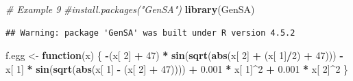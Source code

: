 \documentclass[
]{article}
\newenvironment{Shaded}{\begin{snugshade}}{\end{snugshade}}
\newcommand{\CommentTok}[1]{\textcolor[rgb]{0.56,0.35,0.01}{\textit{#1}}}
\newcommand{\ControlFlowTok}[1]{\textcolor[rgb]{0.13,0.29,0.53}{\textbf{#1}}}
\newcommand{\DecValTok}[1]{\textcolor[rgb]{0.00,0.00,0.81}{#1}}
\newcommand{\FloatTok}[1]{\textcolor[rgb]{0.00,0.00,0.81}{#1}}
\newcommand{\FunctionTok}[1]{\textcolor[rgb]{0.13,0.29,0.53}{\textbf{#1}}}
\newcommand{\NormalTok}[1]{#1}
\newcommand{\OtherTok}[1]{\textcolor[rgb]{0.56,0.35,0.01}{#1}}
\newcommand{\SpecialCharTok}[1]{\textcolor[rgb]{0.81,0.36,0.00}{\textbf{#1}}}
\begin{document}
\begin{Shaded}
\begin{Highlighting}[]
\CommentTok{\# Example 9}
\CommentTok{\#install.packages("GenSA")}
\FunctionTok{library}\NormalTok{(GenSA)}
\end{Highlighting}
\end{Shaded}

\begin{verbatim}
## Warning: package 'GenSA' was built under R version 4.5.2
\end{verbatim}

\begin{Shaded}
\begin{Highlighting}[]
\NormalTok{f.egg }\OtherTok{\textless{}{-}} \ControlFlowTok{function}\NormalTok{(x) \{}
    \SpecialCharTok{{-}}\NormalTok{(x[ }\DecValTok{2}\NormalTok{] }\SpecialCharTok{+} \DecValTok{47}\NormalTok{) }\SpecialCharTok{*} \FunctionTok{sin}\NormalTok{(}\FunctionTok{sqrt}\NormalTok{(}\FunctionTok{abs}\NormalTok{(x[ }\DecValTok{2}\NormalTok{] }\SpecialCharTok{+}\NormalTok{ (x[ }\DecValTok{1}\NormalTok{]}\SpecialCharTok{/}\DecValTok{2}\NormalTok{) }\SpecialCharTok{+} \DecValTok{47}\NormalTok{))) }\SpecialCharTok{{-}}
\NormalTok{        x[ }\DecValTok{1}\NormalTok{] }\SpecialCharTok{*} \FunctionTok{sin}\NormalTok{(}\FunctionTok{sqrt}\NormalTok{(}\FunctionTok{abs}\NormalTok{(x[ }\DecValTok{1}\NormalTok{] }\SpecialCharTok{{-}}\NormalTok{ (x[ }\DecValTok{2}\NormalTok{] }\SpecialCharTok{+} \DecValTok{47}\NormalTok{)))) }\SpecialCharTok{+} \FloatTok{0.001} \SpecialCharTok{*}
\NormalTok{        x[ }\DecValTok{1}\NormalTok{]}\SpecialCharTok{\^{}}\DecValTok{2} \SpecialCharTok{+} \FloatTok{0.001} \SpecialCharTok{*}\NormalTok{ x[ }\DecValTok{2}\NormalTok{]}\SpecialCharTok{\^{}}\DecValTok{2}
\NormalTok{\}}
\end{Highlighting}
\end{Shaded}
\end{document}
